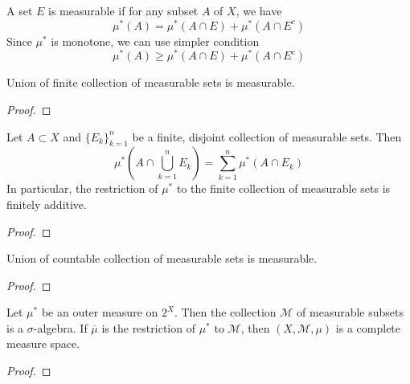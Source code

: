 \begin{definition}
	A set $E$ is measurable if for any subset $A$ of $X$, we have
	$$ \mu^\ast(A) = \mu^\ast(A \cap E) + \mu^\ast(A \cap E^c)$$
	Since $\mu^\ast$ is monotone, we can use simpler condition
	$$ \mu^\ast(A) \ge \mu^\ast(A \cap E) + \mu^\ast(A \cap E^c)$$
\end{definition}

\begin{theorem}
	Union of finite collection of measurable sets is measurable.
\end{theorem}
\begin{proof}
\end{proof}

\begin{theorem}
	Let $A \subset X$ and $\{ E_k \}_{k=1}^n$ be a finite, disjoint collection of measurable sets.
	Then
	$$ \mu^\ast \left( A \cap \bigcup_{k=1}^n E_k \right) = \sum_{k=1}^n \mu^\ast (A \cap E_k) $$
	In particular, the restriction of $\mu^\ast$ to the finite collection of measurable sets is finitely additive.
\end{theorem}
\begin{proof}
\end{proof}

\begin{theorem}
	Union of countable collection of measurable sets is measurable.
\end{theorem}
\begin{proof}
\end{proof}

\begin{theorem}
	Let $\mu^\ast$ be an outer measure on $2^X$.
	Then the collection $\mathcal{M}$ of measurable subsets is a $\sigma$-algebra.
	If $\overline{\mu}$ is the restriction of $\mu^\ast$ to $\mathcal{M}$, then $(X,\mathcal{M},\mu)$ is a complete measure space.
\end{theorem}
\begin{proof}
\end{proof}



